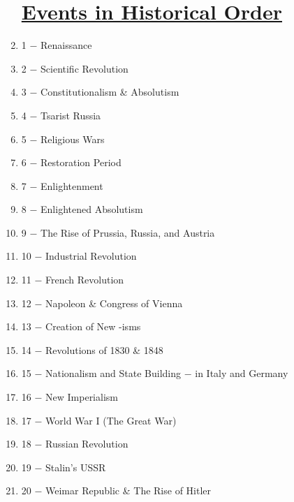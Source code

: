 \documentclass[12pt]{article}
\begin{document}
\begin{enumerate}
\begin{tabular}{l c c c c}
\end{tabular}

\section{\underline{Events in Historical Order}}

\item 1 $-$ Renaissance

\item 2 $-$ Scientific Revolution

\item 3 $-$ Constitutionalism \& Absolutism

\item 4 $-$ Tsarist Russia 
  
\item 5 $-$ Religious Wars

\item 6 $-$ Restoration Period

\item 7 $-$ Enlightenment

\item 8 $-$ Enlightened Absolutism

\item 9 $-$ The Rise of Prussia, Russia, and Austria

\item 10 $-$ Industrial Revolution

\item 11 $-$ French Revolution

\item 12 $-$ Napoleon \& Congress of Vienna

\item 13 $-$ Creation of New -isms

\item 14 $-$ Revolutions of 1830 \& 1848

\item 15 $-$ Nationalism and State Building $-$ in Italy and Germany

\item 16 $-$ New Imperialism

\item 17 $-$ World War I (The Great War)

\item 18 $-$ Russian Revolution

\item 19 $-$ Stalin's USSR

\item 20 $-$ Weimar Republic \& The Rise of Hitler


\end{enumerate}
\end{document}

